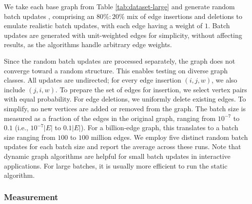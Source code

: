 We take each base graph from Table \ref{tab:dataset-large} and generate random batch updates \cite{com-zarayeneh21}, comprising an $80\% : 20\%$ mix of edge insertions and deletions to emulate realistic batch updates, with each edge having a weight of $1$. Batch updates are generated with unit-weighted edges for simplicity, without affecting results, as the algorithms handle arbitrary edge weights. Since the random batch updates are processed separately, the graph does not converge toward a random structure. This enables testing on diverse graph classes. All updates are undirected; for every edge insertion $(i, j, w)$, we also include $(j, i, w)$. To prepare the set of edges for insertion, we select vertex pairs with equal probability. For edge deletions, we uniformly delete existing edges. To simplify, no new vertices are added or removed from the graph. The batch size is measured as a fraction of the edges in the original graph, ranging from $10^{-7}$ to $0.1$ (i.e., $10^{-7}|E|$ to $0.1|E|$). For a billion-edge graph, this translates to a batch size ranging from $100$ to $100$ million edges. We employ five distinct random batch updates for each batch size and report the average across these runs. Note that dynamic graph algorithms are helpful for small batch updates in interactive applications. For large batches, it is usually more efficient to run the static algorithm.


\subsubsection{Measurement}
\label{sec:measurement}

